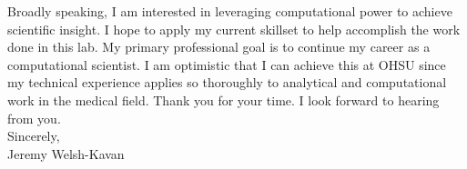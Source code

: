 \documentclass[]{letter}
\begin{document}
Broadly speaking, I am interested in leveraging computational power to achieve scientific insight. I hope to apply my current skillset to help accomplish the work done in this lab. My primary professional goal is to continue my career as a computational scientist. I am optimistic that I can achieve this at OHSU since my technical experience applies so thoroughly to analytical and computational work in the medical field. Thank you for your time. I look forward to hearing from you. \\

Sincerely, \\
Jeremy Welsh-Kavan
\end{document}
